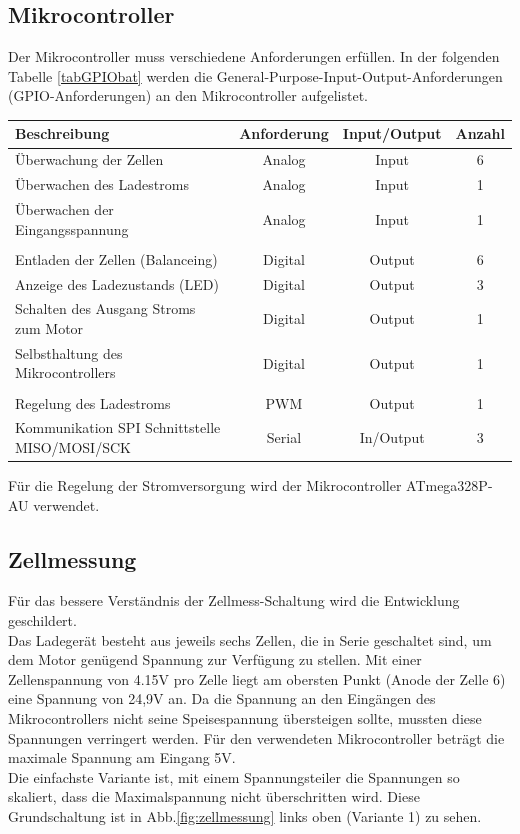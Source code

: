 \subsection*{Mikrocontroller}
Der Mikrocontroller muss verschiedene Anforderungen erfüllen.
In der folgenden Tabelle \ref{tabGPIObat} werden die General-Purpose-Input-Output-Anforderungen (GPIO-Anforderungen) an den Mikrocontroller aufgelistet.
\begin{center}
	\begin{tabular}{l|c|c|c}
		Beschreibung & Anforderung & Input/Output & Anzahl \\ 
		\hline 
		Überwachung der Zellen & Analog & Input & 6 \\ 
		\hline 
		Überwachen des Ladestroms &	Analog & Input & 1 \\ 
		\hline 
		Überwachen der Eingangsspannung & Analog & Input & 1 \\ 
		\hline 
		&  &  &  \\ 
		\hline 
		Entladen der Zellen (Balanceing) & Digital  & Output & 6 \\ 
		\hline 
		Anzeige des Ladezustands (LED) & Digital & Output & 3 \\ 
		\hline 
		Schalten des Ausgang Stroms zum Motor & Digital & Output & 1 \\ 
		\hline 
		Selbsthaltung des Mikrocontrollers & Digital & Output & 1 \\ 
		\hline 
		&  &  &  \\ 
		\hline 
		Regelung des Ladestroms & PWM & Output & 1 \\ 
		\hline 
		Kommunikation SPI Schnittstelle MISO/MOSI/SCK & Serial & In/Output & 3 \\ 
		\hline 
	\end{tabular} 
	\label{tabGPIObat}
\end{center}
Für die Regelung der Stromversorgung wird der Mikrocontroller ATmega328P-AU verwendet.
\subsection*{Zellmessung}
Für das bessere Verständnis der Zellmess-Schaltung wird die Entwicklung geschildert. \\
Das Ladegerät besteht aus jeweils sechs Zellen, die in Serie geschaltet sind, um dem Motor genügend Spannung zur Verfügung zu stellen. Mit einer Zellenspannung von 4.15V pro Zelle liegt am obersten Punkt (Anode der Zelle 6) eine Spannung von 24,9V an. Da die Spannung an den Eingängen des Mikrocontrollers nicht seine Speisespannung übersteigen sollte, mussten diese Spannungen verringert werden. Für den verwendeten Mikrocontroller beträgt die maximale Spannung am Eingang 5V.
\\
Die einfachste Variante ist, mit einem Spannungsteiler die Spannungen so skaliert, dass die Maximalspannung nicht überschritten wird. Diese Grundschaltung ist in Abb.\ref{fig:zellmessung} links oben (Variante 1) zu sehen.

